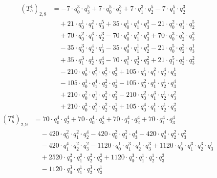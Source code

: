 \begin{align*}(T_{h}^4)_{2,8}&=-7\cdot q_0^{3}\cdot q_3^{5}+7\cdot q_0^{5}\cdot q_3^{3}+7\cdot q_1^{3}\cdot q_2^{5}-7\cdot q_1^{5}\cdot q_2^{3}\\
&\quad +21\cdot q_0^{1}\cdot q_1^{2}\cdot q_3^{5}+35\cdot q_0^{1}\cdot q_1^{4}\cdot q_3^{3}-21\cdot q_0^{2}\cdot q_1^{1}\cdot q_2^{5}\\
&\quad +70\cdot q_0^{2}\cdot q_1^{3}\cdot q_2^{3}-70\cdot q_0^{3}\cdot q_1^{2}\cdot q_3^{3}+70\cdot q_0^{3}\cdot q_2^{2}\cdot q_3^{3}\\
&\quad -35\cdot q_0^{3}\cdot q_2^{4}\cdot q_3^{1}-35\cdot q_0^{4}\cdot q_1^{1}\cdot q_2^{3}-21\cdot q_0^{5}\cdot q_2^{2}\cdot q_3^{1}\\
&\quad +35\cdot q_1^{3}\cdot q_2^{1}\cdot q_3^{4}-70\cdot q_1^{3}\cdot q_2^{3}\cdot q_3^{2}+21\cdot q_1^{5}\cdot q_2^{1}\cdot q_3^{2}\\
&\quad -210\cdot q_0^{1}\cdot q_1^{2}\cdot q_2^{2}\cdot q_3^{3}+105\cdot q_0^{1}\cdot q_1^{2}\cdot q_2^{4}\cdot q_3^{1}\\
&\quad -105\cdot q_0^{1}\cdot q_1^{4}\cdot q_2^{2}\cdot q_3^{1}-105\cdot q_0^{2}\cdot q_1^{1}\cdot q_2^{1}\cdot q_3^{4}\\
&\quad +210\cdot q_0^{2}\cdot q_1^{1}\cdot q_2^{3}\cdot q_3^{2}-210\cdot q_0^{2}\cdot q_1^{3}\cdot q_2^{1}\cdot q_3^{2}\\
&\quad +210\cdot q_0^{3}\cdot q_1^{2}\cdot q_2^{2}\cdot q_3^{1}+105\cdot q_0^{4}\cdot q_1^{1}\cdot q_2^{1}\cdot q_3^{2}\end{align*}
\begin{align*}(T_{h}^4)_{2,9}&=70\cdot q_0^{4}\cdot q_2^{4}+70\cdot q_0^{4}\cdot q_3^{4}+70\cdot q_1^{4}\cdot q_2^{4}+70\cdot q_1^{4}\cdot q_3^{4}\\
&\quad -420\cdot q_0^{2}\cdot q_1^{2}\cdot q_2^{4}-420\cdot q_0^{2}\cdot q_1^{2}\cdot q_3^{4}-420\cdot q_0^{4}\cdot q_2^{2}\cdot q_3^{2}\\
&\quad -420\cdot q_1^{4}\cdot q_2^{2}\cdot q_3^{2}-1120\cdot q_0^{1}\cdot q_1^{3}\cdot q_2^{1}\cdot q_3^{3}+1120\cdot q_0^{1}\cdot q_1^{3}\cdot q_2^{3}\cdot q_3^{1}\\
&\quad +2520\cdot q_0^{2}\cdot q_1^{2}\cdot q_2^{2}\cdot q_3^{2}+1120\cdot q_0^{3}\cdot q_1^{1}\cdot q_2^{1}\cdot q_3^{3}\\
&\quad -1120\cdot q_0^{3}\cdot q_1^{1}\cdot q_2^{3}\cdot q_3^{1}\end{align*}
